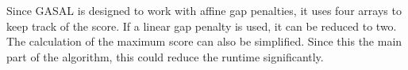 \documentclass[../main/thesis.tex]{subfiles}
\begin{document}
Since GASAL is designed to work with affine gap penalties, it uses four arrays to keep track of the score.
If a linear gap penalty is used, it can be reduced to two.
The calculation of the maximum score can also be simplified.
Since this the main part of the algorithm, this could reduce the runtime significantly.
\end{document}
